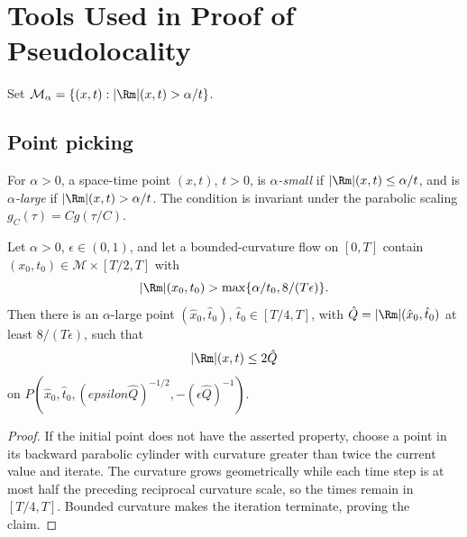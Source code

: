 \chapter[22]{Tools Used in Proof of Pseudolocality}
\label{ch:chow-iii-tools-pseudolocality}

Set \(\mathcal M_\alpha=\{(x,t):|\Rm|(x,t)>\alpha/t\}\).

\section{Point picking}

\begin{definition}
\label{def:chow-iii-alpha-small-large-curvature}
For \(\alpha>0\), a space-time point \((x,t)\), \(t>0\), is
\emph{\(\alpha\)-small} if \(|\Rm|(x,t)\le\alpha/t\), and is
\emph{\(\alpha\)-large} if \(|\Rm|(x,t)>\alpha/t\).  The condition is
invariant under the parabolic scaling \(g_C(\tau)=Cg(\tau/C)\).
\end{definition}

\begin{lemma}
\label{lem:chow-iii-large-curvature-local-control}
Let \(\alpha>0\), \(\epsilon\in(0,1)\), and let a bounded-curvature flow on
\([0,T]\) contain \((x_0,t_0)\in\mathcal M\times[T/2,T]\) with
\[
 |\Rm|(x_0,t_0)>\max\{\alpha/t_0,8/(T\epsilon)\}.
\]
Then there is an \(\alpha\)-large point \((\hat x_0,\hat t_0)\),
\(\hat t_0\in[T/4,T]\), with \(\hat Q=|\Rm|(\hat x_0,\hat t_0)\) at least
\(8/(T\epsilon)\), such that
\[
 |\Rm|(x,t)\le2\hat Q
\]
on \(P(\hat x_0,\hat t_0,(epsilon\hat Q)^{-1/2},-(\epsilon\hat Q)^{-1})\).
\end{lemma}
\begin{proof}
\sketch If the initial point does not have the asserted property, choose a point in
its backward parabolic cylinder with curvature greater than twice the current
value and iterate.  The curvature grows geometrically while each time step is
at most half the preceding reciprocal curvature scale, so the times remain in
\([T/4,T]\).  Bounded curvature makes the iteration terminate, proving the
claim.
\end{proof}

